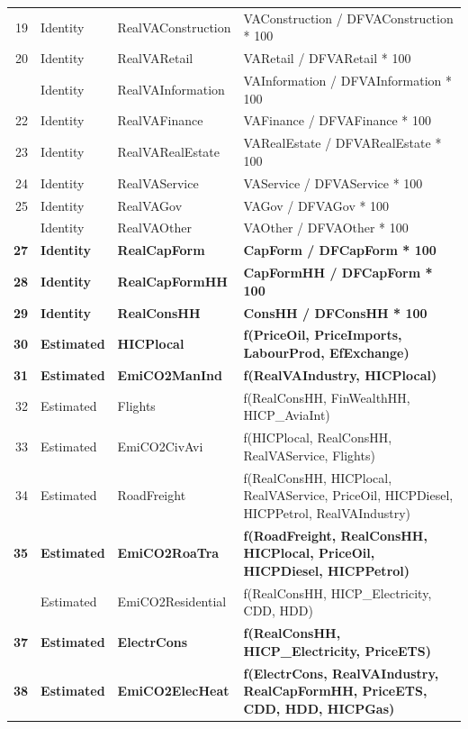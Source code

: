\begin{table}
\begin{tabular}[t]{rll>{\raggedright\arraybackslash}p{10cm}}
19 & Identity & RealVAConstruction & VAConstruction / DFVAConstruction * 100\\
20 & Identity & RealVARetail & VARetail / DFVARetail * 100\\
\addlinespace
21 & Identity & RealVAInformation & VAInformation / DFVAInformation * 100\\
22 & Identity & RealVAFinance & VAFinance / DFVAFinance * 100\\
23 & Identity & RealVARealEstate & VARealEstate / DFVARealEstate * 100\\
24 & Identity & RealVAService & VAService / DFVAService * 100\\
25 & Identity & RealVAGov & VAGov / DFVAGov * 100\\
\addlinespace
26 & Identity & RealVAOther & VAOther / DFVAOther * 100\\
\textbf{27} & \textbf{Identity} & \textbf{RealCapForm} & \textbf{CapForm / DFCapForm * 100}\\
\textbf{28} & \textbf{Identity} & \textbf{RealCapFormHH} & \textbf{CapFormHH / DFCapForm * 100}\\
\textbf{29} & \textbf{Identity} & \textbf{RealConsHH} & \textbf{ConsHH / DFConsHH * 100}\\
\textbf{30} & \textbf{Estimated} & \textbf{HICPlocal} & \textbf{f(PriceOil, PriceImports, LabourProd, EfExchange)}\\
\addlinespace
\textbf{31} & \textbf{Estimated} & \textbf{EmiCO2ManInd} & \textbf{f(RealVAIndustry, HICPlocal)}\\
32 & Estimated & Flights & f(RealConsHH, FinWealthHH,  HICP\_AviaInt)\\
33 & Estimated & EmiCO2CivAvi & f(HICPlocal, RealConsHH, RealVAService, Flights)\\
34 & Estimated & RoadFreight & f(RealConsHH, HICPlocal, RealVAService, PriceOil, HICPDiesel, HICPPetrol, RealVAIndustry)\\
\textbf{35} & \textbf{Estimated} & \textbf{EmiCO2RoaTra} & \textbf{f(RoadFreight, RealConsHH, HICPlocal, PriceOil, HICPDiesel, HICPPetrol)}\\
\addlinespace
36 & Estimated & EmiCO2Residential & f(RealConsHH, HICP\_Electricity, CDD, HDD)\\
\textbf{37} & \textbf{Estimated} & \textbf{ElectrCons} & \textbf{f(RealConsHH, HICP\_Electricity, PriceETS)}\\
\textbf{38} & \textbf{Estimated} & \textbf{EmiCO2ElecHeat} & \textbf{f(ElectrCons, RealVAIndustry, RealCapFormHH, PriceETS, CDD, HDD, HICPGas)}\\

\end{tabular}
\end{table}
